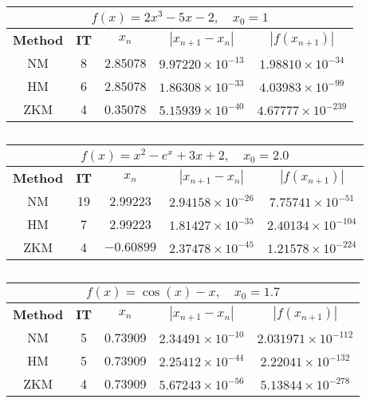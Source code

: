 \begin{table}[H]
		\caption{}
		\centering
		\begin{english}
	\begin{tabular}{|c|c|c|c|c|}
		\hline
		\multicolumn{5}{|c|}{$f(x) = 2x^3 - 5x - 2, \quad x_0 = 1$}\\
		\hline
		\textbf{Method} & \textbf{IT} & $x_n$ & $|x_{n+1}-x_n|$& $|f(x_{n+1})|$ \\
		\hline
		NM & 8 & 2.85078 & $9.97220\times 10^{-13}$ & $1.98810\times 10^{-34}$\\
		HM & 6 & 2.85078 & $1.86308\times 10^{-33}$ & $4.03983\times 10^{-99}$\\
		ZKM & 4 & 0.35078 & $5.15939\times10^{-40}$ & $4.67777 \times10^{-239}$\\
		\hline
	\end{tabular}
\end{english}
\end{table}
\vspace{1cm}
\begin{table}[H]
	\caption{}
		\renewcommand{\arraystretch}{2}
	\centering
	\begin{english}
		\begin{tabular}{|c|c|c|c|c|}
			\hline
			\multicolumn{5}{|c|}{$f(x) = x^2 - e^x + 3x +2, \quad x_0 = 2.0$}\\
			\hline
			\textbf{Method} & \textbf{IT} & $x_n$ & $|x_{n+1}-x_n|$& $|f(x_{n+1})|$ \\
			\hline
			NM & 19 & 2.99223 & $2.94158\times 10^{-26}$ & $7.75741\times 10^{-51}$\\
			HM & 7 & 2.99223 & $1.81427\times 10^{-35}$ & $2.40134\times 10^{-104}$\\
			ZKM & 4 & $-0.60899$ & $2.37478\times10^{-45}$ & $1.21578\times10^{-224}$\\
			\hline
		\end{tabular}
	\end{english}
\end{table}
\newpage
\begin{table}[H]
	\caption{}
		\renewcommand{\arraystretch}{2}
	\centering
	\begin{english}
		\begin{tabular}{|c|c|c|c|c|}
			\hline
			\multicolumn{5}{|c|}{$f(x) = \cos(x) - x, \quad x_0 = 1.7$}\\
			\hline
			\textbf{Method} & \textbf{IT} & $x_n$ & $|x_{n+1}-x_n|$& $|f(x_{n+1})|$ \\
			\hline
			NM & 5 & 0.73909 & $2.34491\times 10^{-10}$ & $2.031971\times 10^{-112}$\\
			HM & 5 & 0.73909 & $2.25412\times 10^{-44}$ & $2.22041\times 10^{-132}$\\
			ZKM & 4 & 0.73909 & $5.67243\times10^{-56}$ & $5.13844 \times10^{-278}$\\
			\hline
		\end{tabular}
	\end{english}
\end{table}
